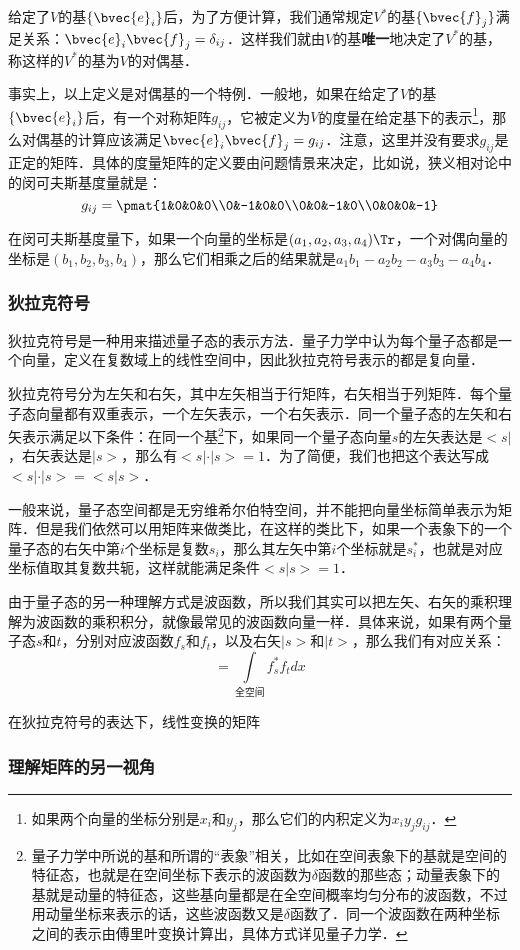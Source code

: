 给定了$V$的基$\{\bvec{e}_i\}$后，为了方便计算，我们通常规定$V^*$的基$\{\bvec{f}_j\}$满足关系：$\bvec{e}_i\bvec{f}_j=\delta_{ij}$．这样我们就由$V$的基\textbf{唯一}地决定了$V^*$的基，称这样的$V^*$的基为$V$的对偶基．

事实上，以上定义是对偶基的一个特例．一般地，如果在给定了$V$的基$\{\bvec{e}_i\}$后，有一个对称矩阵$g_{ij}$，它被定义为$V$的度量在给定基下的表示\footnote{如果两个向量的坐标分别是$x_i$和$y_j$，那么它们的内积定义为$x_iy_jg_{ij}$．}，那么对偶基的计算应该满足$\bvec{e}_i\bvec{f}_j=g_{ij}$．注意，这里并没有要求$g_{ij}$是正定的矩阵．具体的度量矩阵的定义要由问题情景来决定，比如说，狭义相对论中的闵可夫斯基度量就是：
\begin{equation}
g_{ij}=\pmat{1&0&0&0\\0&-1&0&0\\0&0&-1&0\\0&0&0&-1}
\end{equation}

在闵可夫斯基度量下，如果一个向量的坐标是$(a_1, a_2, a_3, a_4)\Tr$，一个对偶向量的坐标是$(b_1, b_2, b_3, b_4)$，那么它们相乘之后的结果就是$a_1b_1-a_2b_2-a_3b_3-a_4b_4$．



\subsubsection{狄拉克符号}

狄拉克符号是一种用来描述量子态的表示方法．量子力学中认为每个量子态都是一个向量，定义在复数域上的线性空间中，因此狄拉克符号表示的都是复向量．

狄拉克符号分为左矢和右矢，其中左矢相当于行矩阵，右矢相当于列矩阵．每个量子态向量都有双重表示，一个左矢表示，一个右矢表示．同一个量子态的左矢和右矢表示满足以下条件：在同一个基\footnote{量子力学中所说的基和所谓的“表象”相关，比如在空间表象下的基就是空间的特征态，也就是在空间坐标下表示的波函数为$\delta$函数的那些态；动量表象下的基就是动量的特征态，这些基向量都是在全空间概率均匀分布的波函数，不过用动量坐标来表示的话，这些波函数又是$\delta$函数了．同一个波函数在两种坐标之间的表示由傅里叶变换计算出，具体方式详见量子力学．}下，如果同一个量子态向量$s$的左矢表达是$<s|$，右矢表达是$|s>$，那么有$<s|\cdot|s>=1$．为了简便，我们也把这个表达写成$<s|\cdot|s>=<s|s>$．

一般来说，量子态空间都是无穷维希尔伯特空间，并不能把向量坐标简单表示为矩阵．但是我们依然可以用矩阵来做类比，在这样的类比下，如果一个表象下的一个量子态的右矢中第$i$个坐标是复数$s_i$，那么其左矢中第$i$个坐标就是$s_i^*$，也就是对应坐标值取其复数共轭，这样就能满足条件$<s|s>=1$．

由于量子态的另一种理解方式是波函数，所以我们其实可以把左矢、右矢的乘积理解为波函数的乘积积分，就像最常见的波函数向量一样．具体来说，如果有两个量子态$s$和$t$，分别对应波函数$f_s$和$f_t$，以及右矢$|s>$和$|t>$，那么我们有对应关系：
\begin{equation}<s|t>=\int\limits_{\text{全空间}}f_s^*f_tdx\end{equation}

在狄拉克符号的表达下，线性变换的矩阵


\subsubsection{理解矩阵的另一视角}






